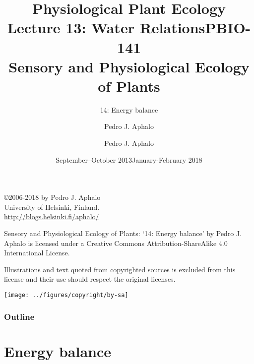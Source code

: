 \documentclass[10pt]{beamer}
\title{Physiological Plant Ecology\\
       Lecture 13: Water Relations}
\author{Pedro J. Aphalo}
\date{September--October 2013}
\begin{document}
\title{PBIO-141\\Sensory and Physiological Ecology of  Plants}
\subtitle{14: Energy balance}
\author{Pedro J. Aphalo}
\date{January-February 2018}


  \begin{frame}
    \maketitle
  \end{frame}

  \begin{frame}[c]
    \begin{center}
      \begin{small}
        \copyright 2006-2018 by Pedro J. Aphalo\\
       University of Helsinki, Finland.\\
        \textcolor{blue}{\url{http://blogs.helsinki.fi/aphalo/}}\\[2ex]
      \end{small}

      \begin{footnotesize}
        Sensory and Physiological Ecology of  Plants: `14: Energy balance' by Pedro J. Aphalo is licensed under a Creative Commons Attribution-ShareAlike 4.0 International License.

        Illustrations and text quoted from copyrighted sources is excluded from this license and their use should respect the original licenses.\\[2ex]
      \end{footnotesize}

      \centering\centering\texttt{[image: ../figures/copyright/by-sa]}
    \end{center}
  \end{frame}

  \begin{frame}
    \frametitle{Outline}
    \tableofcontents
  \end{frame}

\section{Energy balance}
\end{document}

